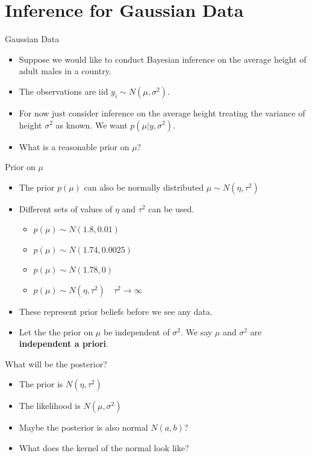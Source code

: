 \documentclass[10pt]{beamer}
\begin{document}
\section{Inference for Gaussian Data}
\begin{frame}{Gaussian Data}
  \begin{itemize}
  \item Suppose we would like to conduct Bayesian inference on the average height of adult males in a country.

  \item The observations are iid $y_i\sim N(\mu,\sigma^2)$.

  \item For now just consider inference on the average height treating the variance of height $\sigma^2$ as known.  We want $p(\mu|y,\sigma^2)$.

  \item What is a reasonable prior on $\mu$?
  \end{itemize}
\end{frame}
\begin{frame}{Prior on $\mu$}
  \begin{itemize}
  \item The prior $p(\mu)$ can also be normally distributed $\mu\sim N(\eta,\tau^2)$

  \item Different sets of values of $\eta$ and $\tau^2$ can be used.

    \begin{itemize}
    \item $p(\mu)\sim N(1.8,0.01)$
    \item $p(\mu)\sim N(1.74,0.0025)$
    \item $p(\mu)\sim N(1.78,0)$
    \item $p(\mu)\sim N(\eta,\tau^2)\quad\tau^2\rightarrow\infty$
    \end{itemize}

  \item These represent prior beliefs before we see any data.
  \item Let the the prior on $\mu$ be independent of $\sigma^2$.  We say  $\mu$ and $\sigma^2$ are  {\bf independent a priori}.
  \end{itemize}
\end{frame}
\begin{frame}{What will be the posterior?}
  \begin{itemize}
  \item The prior is $N(\eta,\tau^2)$

  \item The likelihood is $N(\mu,\sigma^2)$

  \item Maybe the posterior is also normal $N(a,b)$?

  \item What does the kernel of the normal look like?
  \end{itemize}
\end{frame}
\end{document}
